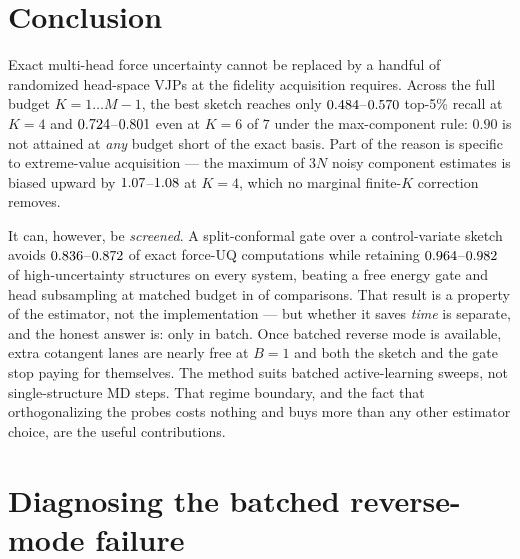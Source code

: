\documentclass{article}
\begin{document}
\section{Conclusion}
Exact multi-head force uncertainty cannot be replaced by a handful of randomized head-space VJPs at
the fidelity acquisition requires. Across the full budget $K=1\ldots M{-}1$, the best sketch reaches
only $0.484$--$0.570$ top-5\% recall at $K{=}4$ and
$0.724$--$0.801$ even at $K{=}6$ of $7$ under the max-component rule:
$0.90$ is not attained at \emph{any} budget short of the exact basis. Part of the reason is specific
to extreme-value acquisition --- the maximum of $3N$ noisy component estimates is biased upward by
$1.07$--$1.08$ at $K{=}4$, which no marginal finite-$K$ correction removes.

It can, however, be \emph{screened}. A split-conformal gate over a control-variate sketch avoids
$0.836$--$0.872$ of exact force-UQ computations while retaining
$0.964$--$0.982$ of high-uncertainty structures on every system, beating a
free energy gate and head subsampling at matched budget in \fsGateCVDominates{} of
\fsGateCVComparisons{} comparisons. That result is a property of the estimator, not the
implementation --- but whether it saves \emph{time} is separate, and the honest answer is: only in
batch. Once batched reverse mode is available, extra cotangent lanes are nearly free at $B{=}1$ and
both the sketch and the gate stop paying for themselves. The method suits batched active-learning
sweeps, not single-structure MD steps. That regime boundary, and the fact that orthogonalizing the
probes costs nothing and buys more than any other estimator choice, are the useful contributions.




\appendix

\section{Diagnosing the batched reverse-mode failure}
\label{app:tensorexpr}
\end{document}
